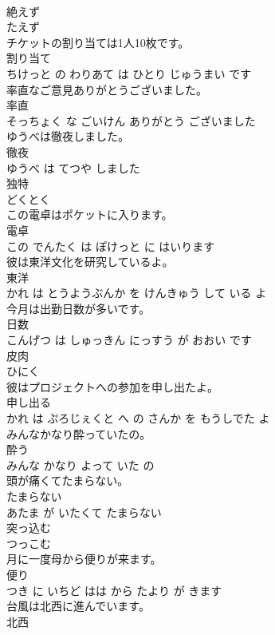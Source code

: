 \documentclass[8pt]{extreport}
\begin{document}
\begin{CJK}{UTF8}{min}
\\	絶えず	
\\	たえず		
\\	チケットの割り当ては1人10枚です。	
\\	割り当て 
\\	ちけっと の わりあて は ひとり じゅうまい です			
\\	率直なご意見ありがとうございました。	
\\	率直 
\\	そっちょく な ごいけん ありがとう ございました			
\\	ゆうべは徹夜しました。	
\\	徹夜 
\\	ゆうべ は てつや しました			
\\	独特	
\\	どくとく		
\\	この電卓はポケットに入ります。	
\\	電卓 
\\	この でんたく は ぽけっと に はいります			
\\	彼は東洋文化を研究しているよ。	
\\	東洋 
\\	かれ は とうようぶんか を けんきゅう して いる よ			
\\	今月は出勤日数が多いです。	
\\	日数 
\\	こんげつ は しゅっきん にっすう が おおい です			
\\	皮肉	
\\	ひにく		
\\	彼はプロジェクトへの参加を申し出たよ。	
\\	申し出る 
\\	かれ は ぷろじぇくと へ の さんか を もうしでた よ			
\\	みんなかなり酔っていたの。	
\\	酔う 
\\	みんな かなり よって いた の			
\\	頭が痛くてたまらない。	
\\	たまらない 
\\	あたま が いたくて たまらない			
\\	突っ込む	
\\	つっこむ		
\\	月に一度母から便りが来ます。	
\\	便り 
\\	つき に いちど はは から たより が きます			
\\	台風は北西に進んでいます。	
\\	北西 

\end{CJK}
\end{document}
